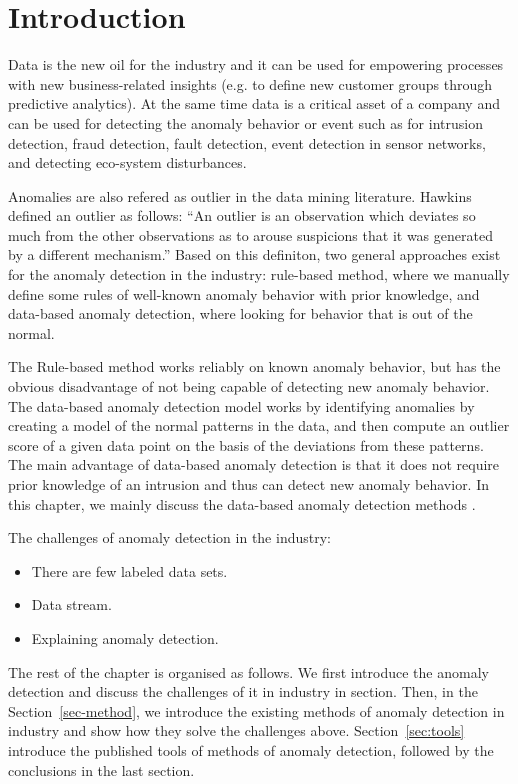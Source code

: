 \section{Introduction}\label{sec-intro}

Data is the new oil for the industry and
it can be used for empowering processes with
new business-related insights
(e.g. to define new customer groups through predictive analytics).
At the same time data is a critical asset of a company and
can be used for detecting the anomaly behavior or event
such as for
intrusion detection,
fraud detection,
fault detection,
event detection in sensor networks,
and detecting eco-system disturbances.

Anomalies are also refered as outlier in the data mining literature.
Hawkins~\cite{hawkins1980identification} defined
an outlier as follows:
``An outlier is an observation which deviates so much from the other observations
as to arouse suspicions that it was generated by a different mechanism.''
Based on this definiton, 
two general approaches exist for the anomaly detection in the industry: 
rule-based method, 
where we manually define some rules of  well-known anomaly behavior
with prior knowledge, 
and data-based anomaly detection, 
where looking for behavior that is out of the normal. 

The Rule-based method works reliably on known anomaly behavior, 
but has the obvious disadvantage of not being capable of 
detecting new anomaly behavior. 
The data-based anomaly detection model works by 
identifying anomalies by creating a model of the normal patterns in the data,
and then compute an outlier score of a given data point 
on the basis of the deviations from these patterns. 
The main advantage of data-based anomaly detection is that
it does not require prior knowledge of an intrusion and
thus can detect new anomaly behavior.
In this chapter,
we mainly discuss the data-based anomaly detection methods .


The challenges of anomaly detection in the industry:
\begin{itemize}
    \item There are few labeled data sets.
    \item Data stream.
    \item Explaining anomaly detection.
\end{itemize}

The rest of the chapter is organised as follows.
We first introduce the anomaly detection and
discuss the challenges of it in industry in section.
Then,
in the Section~\ref{sec-method},
we introduce the existing methods of anomaly detection in
industry and show how they solve the challenges above.
Section~\ref{sec:tools} introduce the published tools of
methods of anomaly detection,
followed by the conclusions in the last section.


